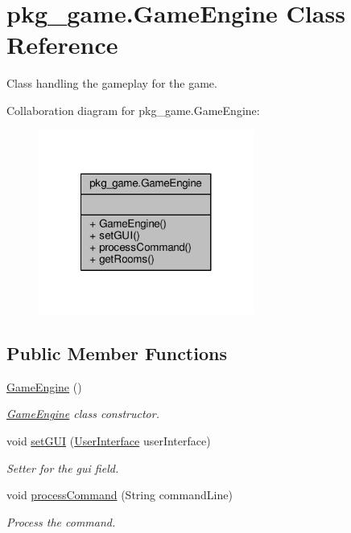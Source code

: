 \hypertarget{classpkg__game_1_1GameEngine}{\section{pkg\-\_\-game.\-Game\-Engine Class Reference}
\label{classpkg__game_1_1GameEngine}
}


Class handling the gameplay for the game.  




Collaboration diagram for pkg\-\_\-game.\-Game\-Engine\-:
\nopagebreak
\begin{figure}[H]
\begin{center}
\leavevmode
\includegraphics[width=200pt]{classpkg__game_1_1GameEngine__coll__graph}
\end{center}
\end{figure}
\subsection*{Public Member Functions}
\begin{DoxyCompactItemize}
\item 
\hyperlink{classpkg__game_1_1GameEngine_a6b6494f73d268d0c394d819c8425f1d5}{Game\-Engine} ()
\begin{DoxyCompactList}\small\item\em \hyperlink{classpkg__game_1_1GameEngine}{Game\-Engine} class constructor. \end{DoxyCompactList}\item 
void \hyperlink{classpkg__game_1_1GameEngine_a0156eb9ee85fc086aef4da8594fb2891}{set\-G\-U\-I} (\hyperlink{classpkg__game_1_1UserInterface}{User\-Interface} user\-Interface)
\begin{DoxyCompactList}\small\item\em Setter for the gui field. \end{DoxyCompactList}\item 
void \hyperlink{classpkg__game_1_1GameEngine_a37887ae202eadba82495da82ac4e1908}{process\-Command} (String command\-Line)
\begin{DoxyCompactList}\small\item\em Process the command. \end{DoxyCompactList}\end{DoxyCompactItemize}
